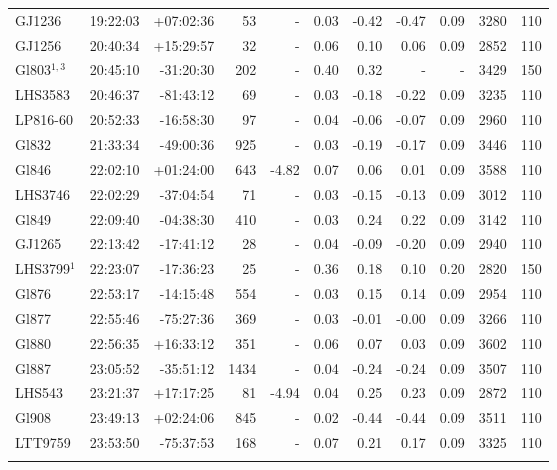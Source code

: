 \documentclass[referee]{aa}
\begin{document}
{\begin{longtable}{l r r r r r r r r r r}
GJ1236 & 19:22:03 & +07:02:36 & 53 &    - & 0.03 & -0.42 & -0.47 & 0.09 & 3280 &  110 \\
GJ1256 & 20:40:34 & +15:29:57 & 32 &    - & 0.06 & 0.10 & 0.06 & 0.09 & 2852 &  110 \\
Gl803$^{1,3}$ & 20:45:10 & -31:20:30 & 202 &    - & 0.40 & 0.32 & - & - & 3429 &  150 \\
LHS3583 & 20:46:37 & -81:43:12 & 69 &    - & 0.03 & -0.18 & -0.22 & 0.09 & 3235 &  110 \\
LP816-60 & 20:52:33 & -16:58:30 & 97 &    - & 0.04 & -0.06 & -0.07 & 0.09 & 2960 &  110 \\
Gl832 & 21:33:34 & -49:00:36 & 925 &    - & 0.03 & -0.19 & -0.17 & 0.09 & 3446 &  110 \\
Gl846 & 22:02:10 & +01:24:00 & 643 & -4.82 & 0.07 & 0.06 & 0.01 & 0.09 & 3588 &  110 \\
LHS3746 & 22:02:29 & -37:04:54 & 71 &    - & 0.03 & -0.15 & -0.13 & 0.09 & 3012 &  110 \\
Gl849 & 22:09:40 & -04:38:30 & 410 &    - & 0.03 & 0.24 & 0.22 & 0.09 & 3142 &  110 \\
GJ1265 & 22:13:42 & -17:41:12 & 28 &    - & 0.04 & -0.09 & -0.20 & 0.09 & 2940 &  110 \\
LHS3799$^1$ & 22:23:07 & -17:36:23 & 25 &    - & 0.36 & 0.18 & 0.10 & 0.20 & 2820 &  150 \\
Gl876 & 22:53:17 & -14:15:48 & 554 &    - & 0.03 & 0.15 & 0.14 & 0.09 & 2954 &  110 \\
Gl877 & 22:55:46 & -75:27:36 & 369 &    - & 0.03 & -0.01 & -0.00 & 0.09 & 3266 &  110 \\
Gl880 & 22:56:35 & +16:33:12 & 351 &    - & 0.06 & 0.07 & 0.03 & 0.09 & 3602 &  110 \\
Gl887 & 23:05:52 & -35:51:12 & 1434 &    - & 0.04 & -0.24 & -0.24 & 0.09 & 3507 &  110 \\
LHS543 & 23:21:37 & +17:17:25 & 81 & -4.94 & 0.04 & 0.25 & 0.23 & 0.09 & 2872 &  110 \\
Gl908 & 23:49:13 & +02:24:06 & 845 &    - & 0.02 & -0.44 & -0.44 & 0.09 & 3511 &  110 \\
LTT9759 & 23:53:50 & -75:37:53 & 168 &    - & 0.07 & 0.21 & 0.17 & 0.09 & 3325 &  110 \\
\label{table:full}
\end{longtable}
}
\end{document}
